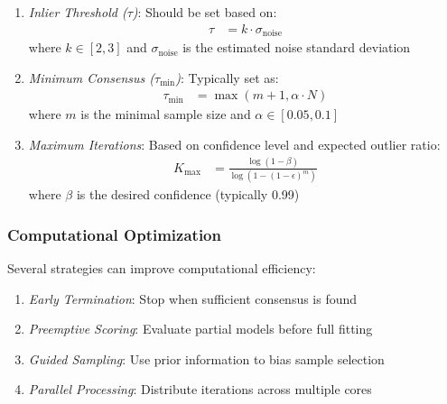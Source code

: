 \documentclass[12pt]{article}
\begin{document}
\begin{enumerate}
    \item \textit{Inlier Threshold ($\tau$)}: Should be set based on:
          \begin{align}
              \tau & = k \cdot \sigma_{\text{noise}} \label{eq:threshold_selection}
          \end{align}
          where $k \in [2, 3]$ and $\sigma_{\text{noise}}$ is the estimated noise standard deviation

    \item \textit{Minimum Consensus ($\tau_{\min}$)}: Typically set as:
          \begin{align}
              \tau_{\min} & = \max(m + 1, \alpha \cdot N) \label{eq:min_consensus}
          \end{align}
          where $m$ is the minimal sample size and $\alpha \in [0.05, 0.1]$

    \item \textit{Maximum Iterations}: Based on confidence level and expected outlier ratio:
          \begin{align}
              K_{\max} & = \frac{\log(1 - \beta)}{\log(1 - (1-\epsilon)^m)} \label{eq:max_iterations}
          \end{align}
          where $\beta$ is the desired confidence (typically 0.99)
\end{enumerate}

\subsubsection{Computational Optimization}
\label{subsubsec:computational_optimization}

Several strategies can improve computational efficiency:

\begin{enumerate}
    \item \textit{Early Termination}: Stop when sufficient consensus is found
    \item \textit{Preemptive Scoring}: Evaluate partial models before full fitting
    \item \textit{Guided Sampling}: Use prior information to bias sample selection
    \item \textit{Parallel Processing}: Distribute iterations across multiple cores
\end{enumerate}
\end{document}
